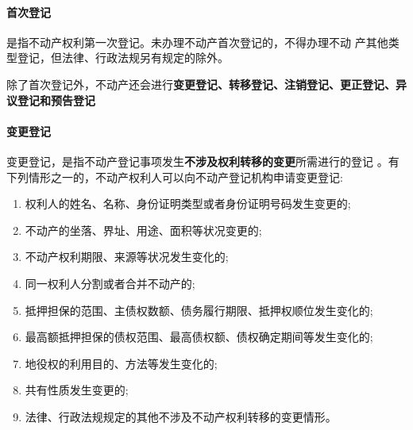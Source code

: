 \documentclass[UTF8,12pt]{ctexart}
\numberwithin{equation}{section} %
\numberwithin{figure}{section}
\numberwithin{table}{section}
\begin{document}
	\paragraph{首次登记} 是指不动产权利第一次登记。未办理不动产首次登记的，不得办理不动 产其他类型登记，但法律、行政法规另有规定的除外。
	
	除了首次登记外，不动产还会进行\textbf{变更登记、转移登记、注销登记、更正登记、异议登记和预告登记}
	
	\paragraph{变更登记}
	变更登记，是指不动产登记事项发生\textbf{不涉及权利转移的变更}所需进行的登记 。有下列情形之一的，不动产权利人可以向不动产登记机构申请变更登记:
	\begin{enumerate}
		\item 权利人的姓名、名称、身份证明类型或者身份证明号码发生变更的;
		
		\item 不动产的坐落、界址、用途、面积等状况变更的;
		
		\item 不动产权利期限、来源等状况发生变化的;
		
		\item 同一权利人分割或者合并不动产的;
		
		\item 抵押担保的范围、主债权数额、债务履行期限、抵押权顺位发生变化的;
		
		\item 最高额抵押担保的债权范围、最高债权额、债权确定期间等发生变化的;
		
		\item 地役权的利用目的、方法等发生变化的;
		
		\item 共有性质发生变更的;
		
		\item 法律、行政法规规定的其他不涉及不动产权利转移的变更情形。
	\end{enumerate}
	
	
\end{document}
